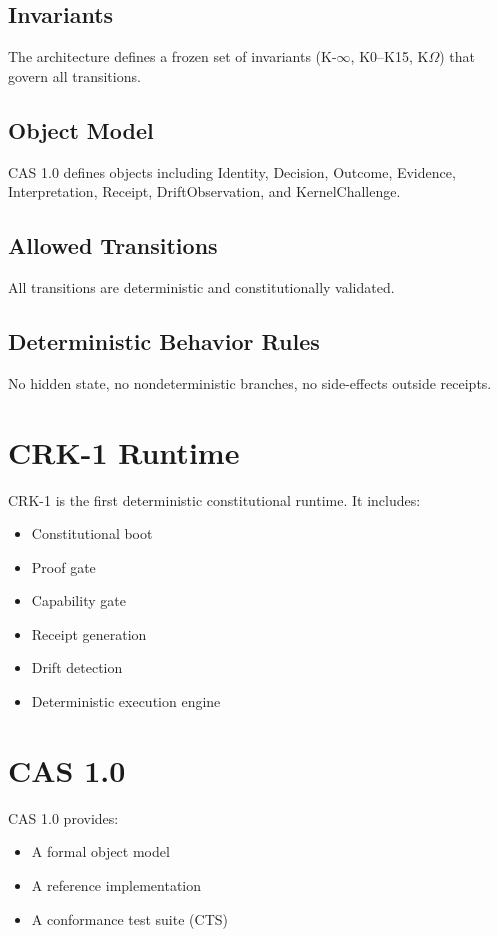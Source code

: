 \documentclass{article}
\begin{document}
\subsection{Invariants}
The architecture defines a frozen set of invariants (K-$\infty$, K0--K15, K$\Omega$) that govern all transitions.

\subsection{Object Model}
CAS 1.0 defines objects including Identity, Decision, Outcome, Evidence, Interpretation, Receipt, DriftObservation, and KernelChallenge.

\subsection{Allowed Transitions}
All transitions are deterministic and constitutionally validated.

\subsection{Deterministic Behavior Rules}
No hidden state, no nondeterministic branches, no side-effects outside receipts.

\section{CRK-1 Runtime}
CRK-1 is the first deterministic constitutional runtime. It includes:
\begin{itemize}
    \item Constitutional boot
    \item Proof gate
    \item Capability gate
    \item Receipt generation
    \item Drift detection
    \item Deterministic execution engine
\end{itemize}

\section{CAS 1.0}
CAS 1.0 provides:
\begin{itemize}
    \item A formal object model
    \item A reference implementation
    \item A conformance test suite (CTS)
\end{itemize}
\end{document}
